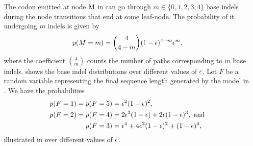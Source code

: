 The codon emitted at node $\mathrm{M}$ in  can go through $m\in\{0, 1, 2, 3,
4\}$ base indels during the node transitions that end at some leaf-node. The probability of
it undergoing $m$ indels is given by
\begin{equation*}
  p(M=m) = \binom{4}{4-m} (1 - \epsilon)^{4-m} \epsilon^m,
\end{equation*}
where the coefficient $\binom{4}{m}$ counts the number of paths corresponding to $m$ base indels.
 shows the base indel distributions over different values of $\epsilon$.
Let $F$ be a random variable representing the final sequence length generated by the model in
.
We have the probabilities
\begin{equation*}
  \begin{split}
    p(F=1) = p(F=5) &= \epsilon^2(1-\epsilon)^2, \\
    p(F=2) = p(F=4) &= 2\epsilon^3(1-\epsilon) + 2\epsilon(1-\epsilon)^3,~\text{and} \\
    p(F=3)          &= \epsilon^4 + 4\epsilon^2(1-\epsilon)^2 + (1-\epsilon)^4,
  \end{split}
\end{equation*}
illustrated in  over different values of $\epsilon$.

